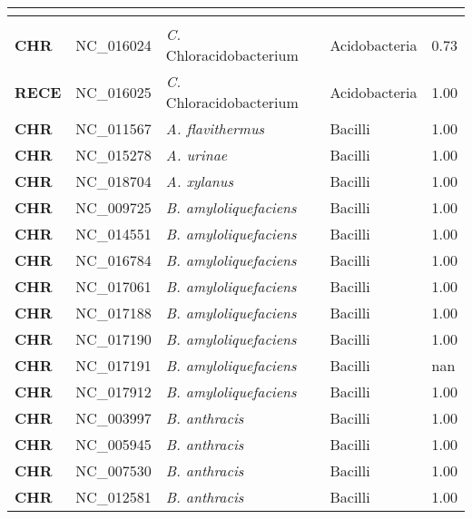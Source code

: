 \setlength{\columnsep}{5cm}
\begin{adjustwidth}{-3cm}{2cm}
\addtolength{\textheight}{5cm}
\addtolength{\voffset}{-1cm}

\begingroup
    \fontsize{8pt}{11pt}\selectfont
   { \tiny
\twocolumn
\begin{supertabular}{>{\bfseries}l|p{0.1\textwidth}p{0.14\textwidth}l|l}
\\
\hline\\
CHR & NC\_016024 & \textit{C. }Chloracidobacterium & Acidobacteria & 0.73\\
RECE & NC\_016025 & \textit{C.} Chloracidobacterium & Acidobacteria & 1.00\\
CHR & NC\_011567 & \textit{A. flavithermus} & Bacilli & 1.00\\
CHR & NC\_015278 & \textit{A. urinae} & Bacilli & 1.00\\
CHR & NC\_018704 & \textit{A. xylanus} & Bacilli & 1.00\\
CHR & NC\_009725 & \textit{B. amyloliquefaciens} & Bacilli & 1.00\\
CHR & NC\_014551 & \textit{B. amyloliquefaciens} & Bacilli & 1.00\\
CHR & NC\_016784 & \textit{B. amyloliquefaciens} & Bacilli & 1.00\\
CHR & NC\_017061 & \textit{B. amyloliquefaciens} & Bacilli & 1.00\\
CHR & NC\_017188 & \textit{B. amyloliquefaciens} & Bacilli & 1.00\\
CHR & NC\_017190 & \textit{B. amyloliquefaciens} & Bacilli & 1.00\\
CHR & NC\_017191 & \textit{B. amyloliquefaciens} & Bacilli & nan\\
CHR & NC\_017912 & \textit{B. amyloliquefaciens} & Bacilli & 1.00\\
CHR & NC\_003997 & \textit{B. anthracis} & Bacilli & 1.00\\
CHR & NC\_005945 & \textit{B. anthracis} & Bacilli & 1.00\\
CHR & NC\_007530 & \textit{B. anthracis} & Bacilli & 1.00\\
CHR & NC\_012581 & \textit{B. anthracis} & Bacilli & 1.00\\

\end{supertabular}}
\end{adjustwidth}
